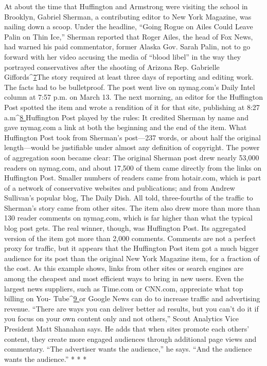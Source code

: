 At about the time that Huffington and Armstrong were visiting the school
in Brooklyn, Gabriel Sherman, a contributing editor to New York Magazine,
was nailing down a scoop. Under the headline, ``Going Rogue on Ailes Could
Leave Palin on Thin Ice,'' Sherman reported that Roger Ailes, the head of Fox
News, had warned his paid commentator, former Alaska Gov. Sarah Palin, not to
go forward with her video accusing the media of ``blood libel'' in the way they
portrayed conservatives after the shooting of Arizona Rep. Gabrielle Giffords^{\href{#endnotes-ch6}{7}}The story required at least three days of reporting and editing work. The facts
had to be bulletproof. The post went live on nymag.com’s Daily Intel column at
7:57 p.m. on March 13.
The next morning, an editor for the Huffington Post spotted the item and wrote
a rendition of it for that site, publishing at 8:27 a.m^{\href{#endnotes-ch6}{8 }}Huffington Post played by
the rules: It credited Sherman by name and gave nymag.com a link at both the
beginning and the end of the item. What Huffington Post took from Sherman’s
post—237 words, or about half the original length—would be justifiable under
almost any definition of copyright.
The power of aggregation soon became clear: The original Sherman post
drew nearly 53,000 readers on nymag.com, and about 17,500 of them came directly
from the links on Huffington Post. Smaller numbers of readers came from hotair.com, which is part of a network of conservative websites and publications;
and from Andrew Sullivan’s popular blog, The Daily Dish. All told, three-fourths
of the traffic to Sherman’s story came from other sites. The item also drew more
than more than 130 reader comments on nymag.com, which is far higher than
what the typical blog post gets.
The real winner, though, was Huffington Post. Its aggregated version of the
item got more than 2,000 comments. Comments are not a perfect proxy for
traffic, but it appears that the Huffington Post item got a much bigger audience
for its post than the original New York Magazine item, for a fraction of the cost.
As this example shows, links from other sites or search engines are among the
cheapest and most efficient ways to bring in new users. Even the largest news
suppliers, such as Time.com or CNN.com, appreciate what top billing on You-
Tube^{\href{#endnotes-ch6}{9 }}or Google News can do to increase traffic and advertising revenue. ``There
are ways you can deliver better ad results, but you can’t do it if you focus on your
own content only and not others,'' Scout Analytics Vice President Matt Shanahan
says. He adds that when sites promote each others’ content, they create more engaged
audiences through additional page views and commentary. ``The advertiser
wants the audience,'' he says. ``And the audience wants the audience.''
* * *

